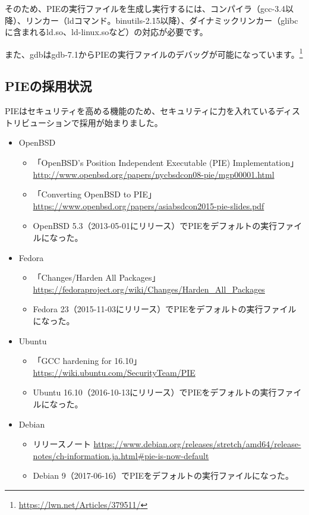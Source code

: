 \documentclass[mingoth,a4paper]{jsarticle}
\begin{document}
そのため、PIEの実行ファイルを生成し実行するには、コンパイラ（gcc-3.4以降）、リンカー（ldコマンド。binutils-2.15以降）、ダイナミックリンカー（glibcに含まれるld.so、ld-linux.soなど）の対応が必要です。


また、gdbはgdb-7.1からPIEの実行ファイルのデバッグが可能になっています。\footnote{\url{https://lwn.net/Articles/379511/}}


\subsection{PIEの採用状況}

PIEはセキュリティを高める機能のため、セキュリティに力を入れているディストリビューションで採用が始まりました。

\begin{itemize}
\item OpenBSD
  \begin{itemize}
  \item 「OpenBSD's Position Independent Executable (PIE) Implementation」 \url{http://www.openbsd.org/papers/nycbsdcon08-pie/mgp00001.html}
  \item 「Converting OpenBSD to PIE」 \url{https://www.openbsd.org/papers/asiabsdcon2015-pie-slides.pdf}
  \item OpenBSD 5.3（2013-05-01にリリース）でPIEをデフォルトの実行ファイルになった。
  \end{itemize}
\item Fedora
  \begin{itemize}
  \item 「Changes/Harden All Packages」 \url{https://fedoraproject.org/wiki/Changes/Harden_All_Packages}
  \item Fedora 23（2015-11-03にリリース）でPIEをデフォルトの実行ファイルになった。
  \end{itemize}
\item Ubuntu
  \begin{itemize}
  \item 「GCC hardening for 16.10」 \url{https://wiki.ubuntu.com/SecurityTeam/PIE}
  \item Ubuntu 16.10（2016-10-13にリリース）でPIEをデフォルトの実行ファイルになった。
  \end{itemize}
\item Debian
  \begin{itemize}
  \item リリースノート \url{https://www.debian.org/releases/stretch/amd64/release-notes/ch-information.ja.html\#pie-is-now-default}
  \item Debian 9（2017-06-16）でPIEをデフォルトの実行ファイルになった。

\end{itemize}
\end{itemize}
\end{document}
